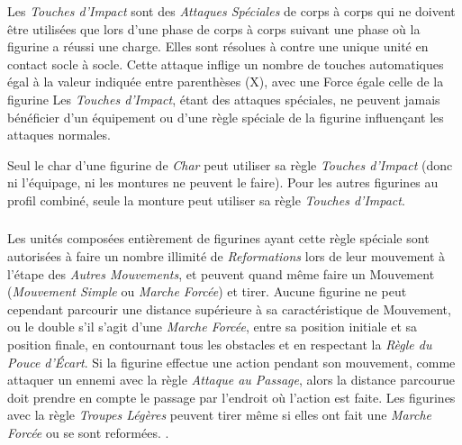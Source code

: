 Les \emph{Touches d'Impact} sont des \emph{Attaques Spéciales} de corps à corps qui ne doivent être utilisées que lors d'une phase de corps à corps suivant une phase
où la figurine a réussi une charge. Elles sont résolues à  contre une unique unité en contact socle à socle. Cette attaque inflige un nombre de touches automatiques égal à la valeur indiquée entre parenthèses (X), avec une Force égale celle de la figurine  Les \emph{Touches d'Impact}, étant des attaques spéciales, ne peuvent jamais bénéficier d'un équipement ou d'une règle spéciale de la figurine influençant les attaques normales. 


Seul le char d'une figurine de \emph{Char} peut utiliser sa règle \emph{Touches d'Impact} (donc ni l'équipage, ni les montures ne peuvent le faire). Pour les autres figurines au profil combiné, seule la monture peut utiliser sa règle \emph{Touches d'Impact}.

\subsubsection*{}

Les unités composées entièrement de figurines ayant cette règle spéciale sont autorisées à faire un nombre illimité de \emph{Reformations} lors de leur mouvement à l'étape des \emph{Autres Mouvements}, et peuvent quand même faire un Mouvement (\emph{Mouvement Simple} ou \emph{Marche Forcée}) et tirer. Aucune figurine ne peut cependant parcourir une distance supérieure à sa caractéristique de Mouvement, ou le double s'il s'agit d'une \emph{Marche Forcée}, entre sa position initiale et sa position finale, en contournant tous les obstacles et en respectant la \emph{Règle du Pouce d'Écart}. Si la figurine effectue une action pendant son mouvement, comme attaquer un ennemi avec la règle \emph{Attaque au Passage}, alors la distance parcourue doit prendre en compte le passage par l'endroit où l'action est faite. Les figurines avec la règle \emph{Troupes Légères} peuvent tirer même si elles ont fait une \emph{Marche Forcée} ou se sont reformées. .

